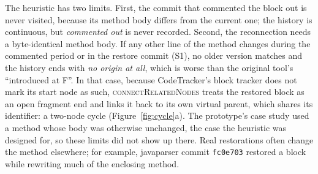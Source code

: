 \documentclass[11pt,a4paper]{article}
\newcommand{\code}[1]{\texttt{#1}}
\newcommand{\change}[1]{\textit{#1}}
\newcommand{\fn}[1]{\textsc{#1}}
\begin{document}
The heuristic has two limits. First, the commit that commented the block out is never visited, because its method body differs from the current one; the history is continuous, but \change{commented out} is never recorded. Second, the reconnection needs a byte-identical method body. If any other line of the method changes during the commented period or in the restore commit (S1), no older version matches and the history ends with \emph{no origin at all}, which is worse than the original tool's ``introduced at F''. In that case, because CodeTracker's block tracker does not mark its start node as such, \fn{connectRelatedNodes} treats the restored block as an open fragment end and links it back to its own virtual parent, which shares its identifier: a two-node cycle (Figure~\ref{fig:cycle}a). The prototype's case study used a method whose body was otherwise unchanged, the case the heuristic was designed for, so these limits did not show up there. Real restorations often change the method elsewhere; for example, javaparser commit \code{fc0e703} restored a block while rewriting much of the enclosing method.
\end{document}
